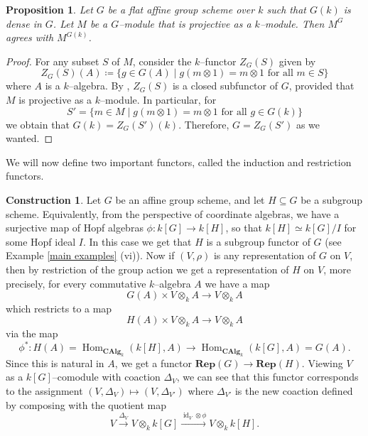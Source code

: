 \documentclass{article}
\theoremstyle{plain}
\newtheorem{Prop}[Th]{Proposition}
\theoremstyle{definition}
\newtheorem{construction}[Th]{Construction}
\DeclareMathOperator{\id}{id}
\DeclareMathOperator{\Hom}{Hom}
\begin{document}
\begin{Prop}\label{Prop:naive invariants vs functorial invariants}
    Let $G$ be a flat affine group scheme over $k$ such that $G(k)$ is dense in $G$. Let $M$ be a $G$--module that is projective as a $k$--module. Then $M^G$ agrees with $M^{G(k)}$. 
\end{Prop} 

\begin{proof}
    For any subset $S$ of $M$, consider the $k$--functor $Z_G(S)$ given by 
    \[
    Z_G(S)(A)\coloneqq \{g\in G(A)\mid g(m\otimes 1)=m\otimes 1\text{ for all } m\in S\}
    \]
    where $A$ is a $k$--algebra. By \cite[Section I.2.12]{jantzen2003representations}, $Z_G(S)$ is a closed subfunctor of $G$, provided that $M$ is projective as a $k$--module. In particular, for 
    \[
    S'=\{m\in M\mid g(m\otimes 1)=m\otimes 1 \text{ for all } g\in G(k)\}
    \]
    we obtain that $G(k)=Z_G(S')(k)$. Therefore, $G=Z_G(S')$ as we wanted.  
\end{proof}



We will now define two important functors, called the induction and restriction functors. 

\begin{construction}
    Let $G$ be an affine group scheme, and let $H\subseteq G$ be a subgroup scheme. Equivalently, from the perspective of coordinate algebras, we have a surjective map of Hopf algebras $\phi\colon k[G]\to k[H]$, so that $k[H]\simeq k[G]/I$ for some Hopf ideal $I$. In this case we get that $H$ is a subgroup functor of $G$ (see Example \ref{main examples} (vi)).
Now if $(V, \rho)$ is any representation of $G$ on $V$, then by restriction of the group action we get a representation of $H$ on $V$, more precisely, for every commutative $k$--algebra $A$ we have a map 
\[
G(A)\times V\otimes_k A\to V\otimes_k A
\]
which restricts to a map 
\[
H(A)\times V\otimes_k A\to V\otimes_k A
\]
via the map 
\[
\phi^\ast\colon  H(A)=\Hom_{\textbf{CAlg}_k}(k[H], A)\to \Hom_{\textbf{CAlg}_k}(k[G], A)=G(A).
\]
Since this is natural in $A$, we get a functor $\mathbf{Rep}(G)\to \mathbf{Rep}(H)$. Viewing $V$ as a $k[G]$--comodule with coaction $\Delta_V$, we can see that this functor corresponds to the assignment $(V, \Delta_V) \mapsto (V, \Delta_{V'})$ where $\Delta_{V'}$ is the new coaction defined by composing with the quotient map 
\[
V\xrightarrow{\Delta_V} V\otimes_k k[G] \xrightarrow{\id_V\otimes \phi} V\otimes_k k[H].
\]
\end{construction}
\end{document}
